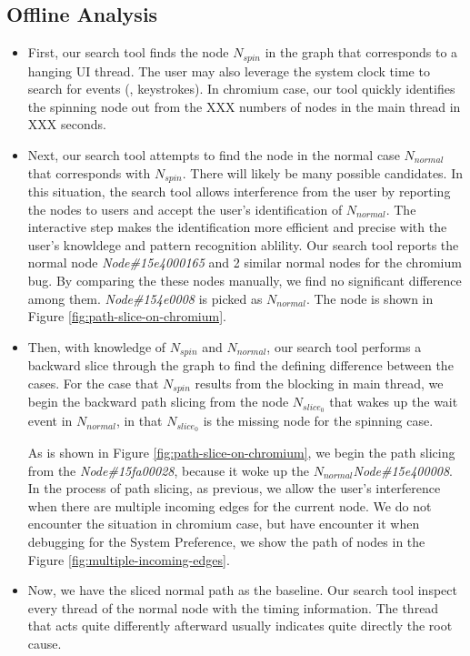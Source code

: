 \subsection{Offline Analysis}
\begin{itemize}
\item First, our search tool finds the node \emph{$N_{spin}$} in the \xxx graph
that corresponds to a hanging UI thread. The user may also leverage
the system clock time to search for events (\eg, keystrokes).
In chromium case, our tool quickly identifies the spinning node out from the
XXX numbers of nodes in the main thread in XXX seconds.

\item Next, our search tool attempts to find the node in the normal case \emph{$N_{normal}$}
that corresponds with $N_{spin}$. There will likely be many possible candidates.
In this situation, the search tool allows interference from the user by reporting the nodes
to users and accept the user's identification of $N_{normal}$.
The interactive step makes the identification more efficient and 
precise with the user's knowldege and pattern recognition ablility. 
Our search tool reports the normal node \textit{Node\#15e4000165} and 2 similar normal nodes
for the chromium bug.
By comparing the these nodes manually, we find no significant difference among them.
\textit{Node\#154e0008} is picked as $N_{normal}$.
The node is shown in Figure \ref{fig:path-slice-on-chromium}.

\item Then, with knowledge of $N_{spin}$ and $N_{normal}$, our search tool
performs a backward slice through the graph to find the defining difference
between the cases. For the case that $N_{spin}$ results from the blocking in main thread,
we begin the backward path slicing from the node $N_{slice_0}$ that wakes up
the wait event in $N_{normal}$, in that $N_{slice_0}$ is the missing node for
the spinning case.

As is shown in Figure \ref{fig:path-slice-on-chromium}, we begin the path slicing
from the \textit{Node\#15fa00028}, because it woke up the $N_{normal}$\textit{Node\#15e400008}.
In the process of path slicing, as previous, we allow the user's
interference when there are multiple incoming edges for the current node.
We do not encounter the situation in chromium case, but have encounter it when debugging
for the System Preference, we show the path of nodes in the Figure \ref{fig:multiple-incoming-edges}.

\item Now, we have the sliced normal path as the baseline. Our search tool inspect every
thread of the normal node with the timing information.
The thread that acts quite differently afterward usually indicates quite directly the root cause.


\end{itemize}
